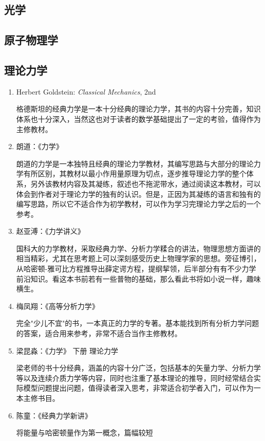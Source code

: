 \subsection*{光学}

\subsection*{原子物理学}

\subsection*{理论力学}

\begin{enumerate}
  \item Herbert Goldstein: \textit{Classical Mechanics}, 2nd

  格德斯坦的经典力学是一本十分经典的理论力学，其书的内容十分完善，知识体系也十分深入，当然这也对于读者的数学基础提出了一定的考验，值得作为主修教材。
  \item 朗道：《力学》

  朗道的力学是一本独特且经典的理论力学教材，其编写思路与大部分的理论力学有所区别，其教材以最小作用量原理为切点，逐步推导理论力学的整个体系，另外该教材内容及其凝练，叙述也不拖泥带水，通过阅读这本教材，可以体会到作者对于理论力学的独有的认识。但是，正因为其凝练的语言和独有的编写思路，所以它不适合作为初学教材，可以作为学习完理论力学之后的一个参考。
  \item 赵亚溥：《力学讲义》

  国科大的力学教材，采取经典力学、分析力学糅合的讲法，物理思想方面讲的相当精彩，尤其在思考题上可以深刻感受历史上物理学家的思想。旁征博引，从哈密顿-雅可比方程推导出薛定谔方程，提纲挈领，后半部分有有不少力学前沿知识。看这本书前若有一些普物的基础，那么看此书将如小说一样，趣味横生。
  \item 梅凤翔：《高等分析力学》

  完全"少儿不宜"的书，一本真正的力学的专著。基本能找到所有分析力学问题的答案，适合用来参考，非常不适合当作主修教材。
  \item 梁昆淼：《力学》 下册 理论力学

  梁老师的书十分经典，涵盖的内容十分广泛，包括基本的矢量力学、分析力学等以及连续介质力学等内容，同时也注重了基本理论的推导，同时经常结合实际模型问题提出问题，值得读者深入思考，非常适合初学者入门，可以作为一本主修书目。

  \item 陈童：《经典力学新讲》

  将能量与哈密顿量作为第一概念，篇幅较短


\end{enumerate}
